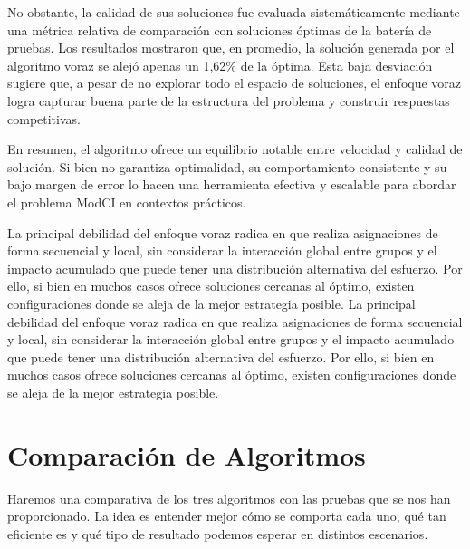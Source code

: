 \documentclass[11pt,letter]{article}
\begin{document}
    No obstante, la calidad de sus soluciones fue evaluada sistemáticamente mediante una métrica relativa de comparación con soluciones óptimas de la batería de pruebas. Los resultados mostraron que, en promedio, la solución generada por el algoritmo voraz se alejó apenas un 1{,}62\% de la óptima. Esta baja desviación sugiere que, a pesar de no explorar todo el espacio de soluciones, el enfoque voraz logra capturar buena parte de la estructura del problema y construir respuestas competitivas.


    En resumen, el algoritmo ofrece un equilibrio notable entre velocidad y calidad de solución. Si bien no garantiza optimalidad, su comportamiento consistente y su bajo margen de error lo hacen una herramienta efectiva y escalable para abordar el problema ModCI en contextos prácticos.
    \begin{tcolorbox}[colback=red!5!white, colframe=red!50!black, title=Advertencia sobre la correctitud]
            La principal debilidad del enfoque voraz radica en que realiza asignaciones de forma secuencial y local, sin considerar la interacción global entre grupos y el impacto acumulado que puede tener una distribución alternativa del esfuerzo. Por ello, si bien en muchos casos ofrece soluciones cercanas al óptimo, existen configuraciones donde se aleja de la mejor estrategia posible.
            La principal debilidad del enfoque voraz radica en que realiza asignaciones de forma secuencial y local, sin considerar la interacción global entre grupos y el impacto acumulado que puede tener una distribución alternativa del esfuerzo. Por ello, si bien en muchos casos ofrece soluciones cercanas al óptimo, existen configuraciones donde se aleja de la mejor estrategia posible.
        \end{tcolorbox}


    \newpage



    \section{Comparación de Algoritmos}

    Haremos una comparativa de los tres algoritmos con las pruebas que se nos han proporcionado. La idea es entender mejor cómo se comporta cada uno, qué tan eficiente es y qué tipo de resultado podemos esperar en distintos escenarios.
\end{document}
